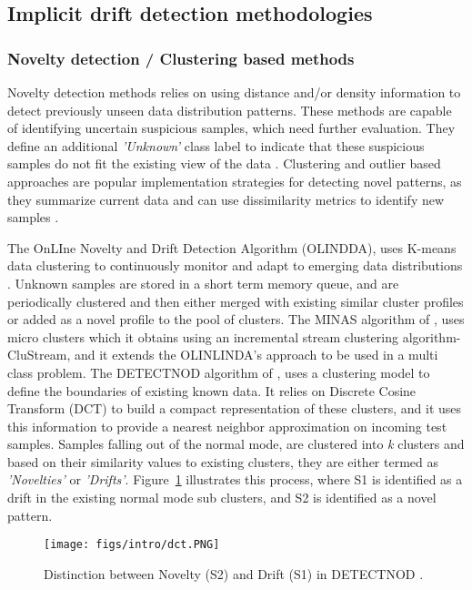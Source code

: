 \documentclass[authoryear,3p,times,twocolumn]{elsarticle}
\begin{document}
\subsection{Implicit drift detection methodologies}
\label{sec:implicit}

\subsubsection{Novelty detection / Clustering based methods}
\label{sec:lr_novelty}

Novelty detection methods relies on using distance and/or density information to detect previously unseen data distribution patterns. These methods are capable of identifying uncertain suspicious samples, which need further evaluation. They define an additional \textit{'Unknown'} class label to indicate that these suspicious samples do not fit the existing view of the data \citep{spinosa2007olindda}. Clustering and outlier based approaches are popular implementation strategies for detecting novel patterns, as they summarize current data and can use dissimilarity metrics to identify new samples \citep{ryu2012efficient}.

The OnLIne Novelty and Drift Detection Algorithm (OLINDDA), uses K-means data clustering to continuously monitor and adapt to emerging data distributions \citep{spinosa2007olindda}. Unknown samples are stored in a short term memory queue, and are periodically clustered and then either merged with existing similar cluster profiles or added as a novel profile to the pool of clusters. The MINAS algorithm of \citep{faria2013novelty}, uses micro clusters which it obtains using an incremental stream clustering algorithm- CluStream, and it extends the OLINLINDA’s approach to be used in a multi class problem. The DETECTNOD algorithm of  \citep{hayat2010dct}, uses a clustering model to define the boundaries of existing known data. It relies on Discrete Cosine Transform (DCT) to build a compact representation of these clusters, and it uses this information to provide a nearest neighbor approximation on incoming test samples. Samples falling out of the normal mode, are clustered into \textit{k} clusters and based on their similarity values to existing clusters, they are either termed as \textit{'Novelties'} or \textit{'Drifts'}. Figure~\ref{fig:detectnod} illustrates this process, where S1 is identified as a drift in the existing normal mode sub clusters, and S2 is identified as a novel pattern.

\begin{figure}[t]
  \centering
  \texttt{[image: figs/intro/dct.PNG]}
   \caption{Distinction between Novelty (S2) and Drift (S1) in DETECTNOD \citep{hayat2010dct}.}
  \label{fig:detectnod}
\end{figure}
\end{document}
